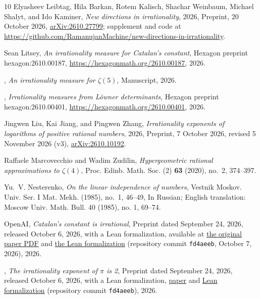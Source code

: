 \documentclass[11pt]{amsart}
\theoremstyle{definition}
\theoremstyle{remark}
\numberwithin{equation}{section}
\begin{document}
\begin{thebibliography}{10}
Elyasheev Leibtag, Hila Barkan, Rotem Kalisch, Shachar Weinbaum, Michael
  Shalyt, and Ido Kaminer, \emph{New directions in irrationality}, 2026,
  Preprint, 20 October 2026,
  \href{https://arxiv.org/abs/2610.27799}{arXiv:2610.27799}; supplement and
  code at
  \url{https://github.com/RamanujanMachine/new-directions-in-irrationality}.

Sean Litsey, \emph{An irrationality measure for {C}atalan's constant}, Hexagon
  preprint hexagon:2610.00187, \url{https://hexagonmath.org/2610.00187}, 2026.

\bysame, \emph{An irrationality measure for {$\zeta(5)$}}, Manuscript, 2026.

\bysame, \emph{Irrationality measures from {L\"owner} determinants}, Hexagon
  preprint hexagon:2610.00401, \url{https://hexagonmath.org/2610.00401}, 2026.

Jingwen Liu, Kai Jiang, and Pingwen Zhang, \emph{Irrationality exponents of
  logarithms of positive rational numbers}, 2026, Preprint, 7 October 2026,
  revised 5 November 2026 (v3),
  \href{https://arxiv.org/abs/2610.10192}{arXiv:2610.10192}.

Raffaele Marcovecchio and Wadim Zudilin, \emph{Hypergeometric rational
  approximations to {$\zeta(4)$}}, Proc. Edinb. Math. Soc. (2) \textbf{63}
  (2020), no.~2, 374--397.

Yu.~V. Nesterenko, \emph{On the linear independence of numbers}, Vestnik
  Moskov. Univ. Ser. I Mat. Mekh. (1985), no.~1, 46--49, In Russian; English
  translation: Moscow Univ. Math. Bull. 40 (1985), no. 1, 69--74.

{OpenAI}, \emph{Catalan's constant is irrational}, Preprint dated September 24,
  2026, released October 6, 2026, with a Lean formalization, available at
  \href{https://github.com/openai/math/blob/fd4aeeb2ee4fc729c18d98444fed42fd0529eeeb/preprints/Catalans-constant-is-irrational-September-24-2026/paper.pdf}{the
  original paper PDF} and
  \href{https://github.com/openai/math/tree/fd4aeeb2ee4fc729c18d98444fed42fd0529eeeb/lean/OAI/NumberTheory/Catalan}{the
  Lean formalization} (repository commit \texttt{fd4aeeb}, October 7, 2026),
  2026.

\bysame, \emph{The irrationality exponent of {$\pi$} is 2}, Preprint dated
  September 24, 2026, released October 6, 2026, with a Lean formalization,
  \href{https://github.com/openai/math/tree/fd4aeeb2ee4fc729c18d98444fed42fd0529eeeb/preprints/The-irrationality-exponent-of-pi-is-2-September-24-2026}{paper}
  and
  \href{https://github.com/openai/math/tree/fd4aeeb2ee4fc729c18d98444fed42fd0529eeeb/lean/OAI/NumberTheory/PiExponent}{Lean
  formalization} (repository commit \texttt{fd4aeeb}), 2026.


\end{thebibliography}
\end{document}

